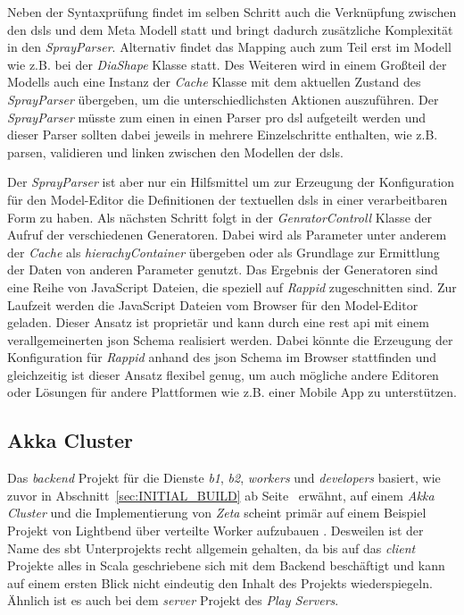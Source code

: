 Neben der Syntaxprüfung findet im selben Schritt auch die Verknüpfung zwischen den \acp{dsl} und dem Meta Modell statt und bringt dadurch zusätzliche Komplexität in den \textit{SprayParser}. Alternativ findet das Mapping auch zum Teil erst im Modell wie z.B. bei der \textit{DiaShape} Klasse statt. Des Weiteren wird in einem Großteil der Modells auch eine Instanz der \textit{Cache} Klasse mit dem aktuellen Zustand des \textit{SprayParser} übergeben, um die unterschiedlichsten Aktionen auszuführen. Der \textit{SprayParser} müsste zum einen in einen Parser pro \ac{dsl} aufgeteilt werden und dieser Parser sollten dabei jeweils in mehrere Einzelschritte enthalten, wie z.B. parsen, validieren und linken zwischen den Modellen der \acp{dsl}.

Der \textit{SprayParser} ist aber nur ein Hilfsmittel um zur Erzeugung der Konfiguration für den Model-Editor die Definitionen der textuellen \acp{dsl} in einer verarbeitbaren Form zu haben. Als nächsten Schritt folgt in der \textit{GenratorControll} Klasse der Aufruf der verschiedenen Generatoren. Dabei wird als Parameter unter anderem der \textit{Cache} als \textit{hierachyContainer} übergeben oder als Grundlage zur Ermittlung der Daten von anderen Parameter genutzt. Das Ergebnis der Generatoren sind eine Reihe von JavaScript Dateien, die speziell auf \textit{Rappid} zugeschnitten sind. Zur Laufzeit werden die JavaScript Dateien vom Browser für den Model-Editor geladen. Dieser Ansatz ist proprietär und kann durch eine \ac{rest} \ac{api} mit einem verallgemeinerten \ac{json} Schema realisiert werden. Dabei könnte die Erzeugung der Konfiguration für \textit{Rappid} anhand des \ac{json} Schema im Browser stattfinden und gleichzeitig ist dieser Ansatz flexibel genug, um auch mögliche andere Editoren oder Lösungen für andere Plattformen wie z.B. einer Mobile App zu unterstützen.

\subsection{Akka Cluster}

Das \textit{backend} Projekt für die Dienste \textit{b1}, \textit{b2}, \textit{workers} und \textit{developers} basiert, wie zuvor in Abschnitt~\ref{sec:INITIAL_BUILD} ab Seite~\pageref{sec:INITIAL_BUILD} erwähnt, auf einem \textit{Akka Cluster} und die Implementierung von \textit{Zeta} scheint primär auf einem Beispiel Projekt von Lightbend über verteilte Worker aufzubauen \cite{lightbend_distributed_worker}. Desweilen ist der Name des \ac{sbt} Unterprojekts recht allgemein gehalten, da bis auf das \textit{client} Projekte alles in Scala geschriebene sich mit dem Backend beschäftigt und kann auf einem ersten Blick nicht eindeutig den Inhalt des Projekts wiederspiegeln. Ähnlich ist es auch bei dem \textit{server} Projekt des \textit{Play Servers}.


